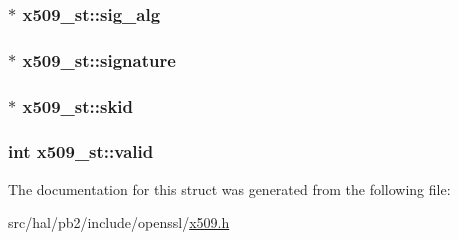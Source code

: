 \subsubsection[{\texorpdfstring{sig\+\_\+alg}{sig_alg}}]{$\ast$ x509\+\_\+st\+::sig\+\_\+alg}\hypertarget{structx509__st_a90d06c88fff740923082fa98b7b86b27}{}\label{structx509__st_a90d06c88fff740923082fa98b7b86b27}
\subsubsection[{\texorpdfstring{signature}{signature}}]{$\ast$ x509\+\_\+st\+::signature}\hypertarget{structx509__st_a8a1e43923e1855fb1dbfe15730cd5e7f}{}\label{structx509__st_a8a1e43923e1855fb1dbfe15730cd5e7f}
\subsubsection[{\texorpdfstring{skid}{skid}}]{$\ast$ x509\+\_\+st\+::skid}\hypertarget{structx509__st_a6ebe771c246586c77c91f2deca26b84d}{}\label{structx509__st_a6ebe771c246586c77c91f2deca26b84d}
\subsubsection[{\texorpdfstring{valid}{valid}}]{\setlength{\rightskip}{0pt plus 5cm}int x509\+\_\+st\+::valid}\hypertarget{structx509__st_a1e506073c0b53c10a6007f5fa9428c35}{}\label{structx509__st_a1e506073c0b53c10a6007f5fa9428c35}


The documentation for this struct was generated from the following file\+:\begin{DoxyCompactItemize}
\item 
src/hal/pb2/include/openssl/\hyperlink{x509_8h}{x509.\+h}\end{DoxyCompactItemize}
